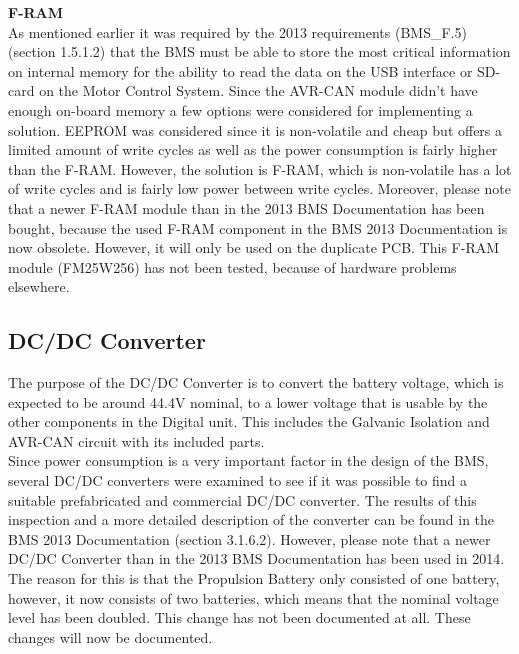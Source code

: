 \textbf{F-RAM}\\
As mentioned earlier it was required by the 2013 requirements (BMS\_F.5)\cite{BMSDocumentation} (section 1.5.1.2) that the BMS must be able to store the most critical information on internal memory for the ability to read the data on the USB interface or SD-card on the Motor Control System. Since the AVR-CAN module didn't have enough on-board memory a few options were considered for implementing a solution. EEPROM was considered since it is non-volatile and cheap but offers a limited amount of write cycles as well as the power consumption is fairly higher than the F-RAM. However, the solution is F-RAM, which is non-volatile has a lot of write cycles and is fairly low power between write cycles. Moreover, please note that a newer F-RAM module than in the 2013 BMS Documentation has been bought, because the used F-RAM component in the BMS 2013 Documentation is now obsolete. However, it will only be used on the duplicate PCB. This F-RAM module (FM25W256) has not been tested, because of hardware problems elsewhere.

\subsection{DC/DC Converter}
\label{sec:DCDCNEW}
The purpose of the DC/DC Converter is to convert the battery voltage, which is expected to be around 44.4V nominal, to a lower voltage that is usable by the other components in the Digital unit. This includes the Galvanic Isolation and AVR-CAN circuit with its included parts. \\
Since power consumption is a very important factor in the design of the BMS, several DC/DC converters were examined to see if it was possible to find a suitable prefabricated and commercial DC/DC converter. The results of this inspection and a more detailed description of the converter can be found in the BMS 2013 Documentation \cite{BMSDocumentation} (section 3.1.6.2). However, please note that a newer DC/DC Converter than in the 2013 BMS Documentation has been used in 2014. The reason for this is that the Propulsion Battery only consisted of one battery, however, it now consists of two batteries, which means that the nominal voltage level has been doubled. This change has not been documented at all. These changes will now be documented.

